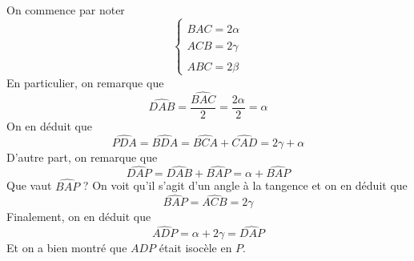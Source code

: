 \begin{sol}
\begin{center}
\end{center}

On commence par noter $$\left\{
    \begin{array}{ll}
        \widehat{BAC}=2\alpha\\
        \widehat{ACB}=2\gamma\\
        \widehat{ABC}=2\beta
    \end{array}
\right.$$
En particulier, on remarque que
$$\widehat{DAB}=\frac{\widehat{BAC}}{2}=\frac{2\alpha}{2}=\alpha $$
On en déduit que
$$\widehat{PDA}=\widehat{BDA}=\widehat{BCA}+\widehat{CAD}=2\gamma+\alpha $$
D'autre part, on remarque que
$$\widehat{DAP}=\widehat{DAB}+\widehat{BAP}=\alpha+\widehat{BAP} $$
Que vaut $\widehat{BAP}$ ? On voit qu'il s'agit d'un angle à la tangence et on en déduit que
$$ \widehat{BAP}=\widehat{ACB}=2\gamma$$
Finalement, on en déduit que
$$\widehat{ADP}=\alpha+2\gamma=\widehat{DAP} $$
Et on a bien montré que $ADP$ était isocèle en $P$.
\end{sol}


